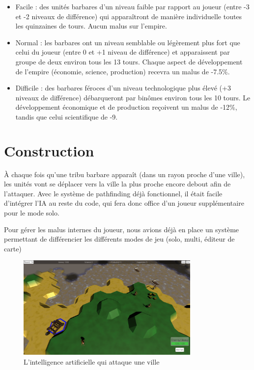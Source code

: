 \documentclass[12pt]{report}
\begin{document}
\begin{itemize}
    \item Facile : des unités barbares d'un niveau faible par rapport au joueur
        (entre -3 et -2 niveaux de différence) qui apparaîtront de manière
        individuelle toutes les quinzaines de tours. Aucun malus sur l'empire.
    \item Normal : les barbares ont un niveau semblable ou légèrement plus fort
        que celui du joueur (entre 0 et +1 niveau de différence) et apparaissent
        par groupe de deux environ tous les 13 tours. Chaque aspect de
        développement de l'empire (économie, science, production) recevra un
        malus de -7.5\%.
    \item Difficile : des barbares féroces d'un niveau technologique plus élevé
        (+3 niveaux de différence) débarqueront par binômes environ tous les 10
        tours. Le développement économique et de production reçoivent un malus
        de -12\%, tandis que celui scientifique de -9.
\end{itemize}

\section{Construction}

À chaque fois qu’une tribu barbare apparaît (dans un rayon proche d’une ville),
les unités vont se déplacer vers la ville la plus proche encore debout afin de
l’attaquer. Avec le système de pathfinding déjà fonctionnel, il était facile
d’intégrer l’IA au reste du code, qui fera donc office d’un joueur
supplémentaire pour le mode solo.

Pour gérer les malus internes du joueur, nous avions déjà en place un système
permettant de différencier les différents modes de jeu (solo, multi, éditeur de
carte)

\vspace{1cm}

\begin{figure}[H]
    \centering
    \includegraphics[width=0.8\textwidth]{ai}
    \caption*{L'intelligence artificielle qui attaque une ville}
\end{figure}
\end{document}
